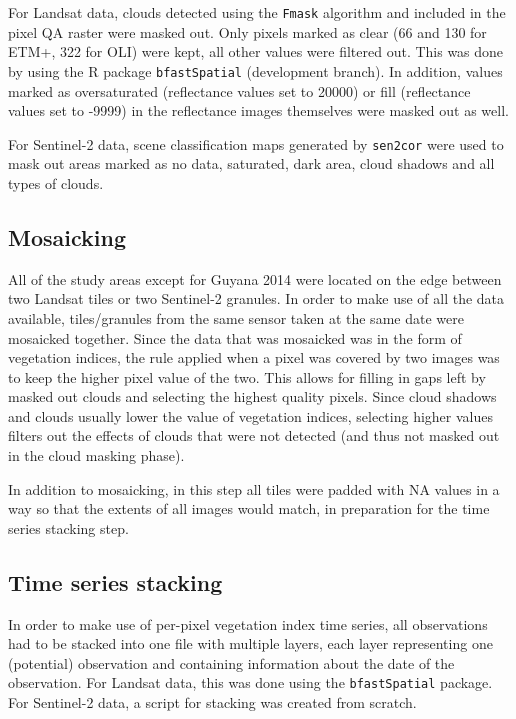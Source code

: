 \documentclass[a4paper,12pt]{scrbook}
\begin{document}
For Landsat data, clouds detected using the \texttt{Fmask} algorithm and included in the pixel QA raster were masked out. Only pixels marked as clear (66 and 130 for \ac{ETM+}, 322 for \ac{OLI}) were kept, all other values were filtered out. This was done by using the R package \texttt{bfastSpatial} (development branch). In addition, values marked as oversaturated (reflectance values set to 20000) or fill (reflectance values set to -9999) in the reflectance images themselves were masked out as well.

For Sentinel-2 data, scene classification maps generated by \texttt{sen2cor} were used to mask out areas marked as no data, saturated, dark area, cloud shadows and all types of clouds.

\subsection{Mosaicking}

All of the study areas except for Guyana 2014 were located on the edge between two Landsat tiles or two Sentinel-2 granules. In order to make use of all the data available, tiles/granules from the same sensor taken at the same date were mosaicked together. Since the data that was mosaicked was in the form of vegetation indices, the rule applied when a pixel was covered by two images was to keep the higher pixel value of the two. This allows for filling in gaps left by masked out clouds and selecting the highest quality pixels. Since cloud shadows and clouds usually lower the value of vegetation indices, selecting higher values filters out the effects of clouds that were not detected (and thus not masked out in the cloud masking phase).

In addition to mosaicking, in this step all tiles were padded with \ac{NA} values in a way so that the extents of all images would match, in preparation for the time series stacking step.

\subsection{Time series stacking}

In order to make use of per-pixel vegetation index time series, all observations had to be stacked into one file with multiple layers, each layer representing one (potential) observation and containing information about the date of the observation. For Landsat data, this was done using the \texttt{bfastSpatial} package. For Sentinel-2 data, a script for stacking was created from scratch.
\end{document}
